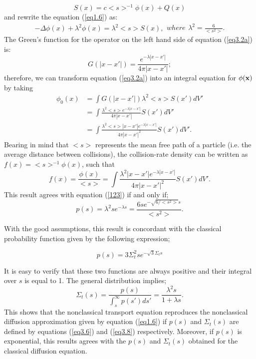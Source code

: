 \documentclass[a4paper, 12pt]{report}
\newcommand{\bl}{\big<}
\newcommand{\bg}{\big>}
\begin{document}
\begin{equation}
S(x) = c\bl s\bg^{-1}\phi(x)+Q(x)
\end{equation} 
and rewrite the equation (\ref{eq1.6}) as:
\begin{subequations}\label{eq3.2}
\begin{align}
-\Delta\phi(x) + \lambda^2 \phi(x) = \lambda^2 \bl s \bg S(x),\label{eq3.2a}
\end{align}
where
\begin{align}
\lambda^2=\frac{6}{\bl s^2 \bg}.
\end{align}
\end{subequations}
The Green's function for the operator on the left hand side of equation (\ref{eq3.2a}) is:
\begin{equation}
\label{eq3.3}
G(|x-x'|) = \frac{e^{-\lambda |x-x'|}}{4\pi |x-x'|};
\end{equation}
therefore, we can transform equation (\eqref{eq3.2a}) into an integral equation for $\phi(\bf x)$ by taking
\begin{align}\label{eq3.4}
\phi_0(x) &= \int G(|x-x'|) \lambda^2\bl s \bg S(x') dV' \\
&= \int \frac{\lambda^2\bl s \bg e^{-\lambda |x-x'|}}{4\pi  |x-x'|} S(x') dV'  \nonumber \\
&= \int \frac{\lambda^2 \bl s \bg |x-x'| e^{-\lambda |x-x'|}}{4\pi |x-x'|^2} S(x') dV'.\nonumber
\end{align}
Bearing in mind that $\bl s\bg$ represents the mean free path of a particle (i.e. the average distance between collisions), the collision-rate density can be written as $f(x)=\bl s\bg^{-1} \phi(x)$, such that
\begin{equation}
\label{eq3.5}
f(x)=\frac{\phi(x)}{\bl s \bg} = \int \frac{\lambda^2 |x-x'| e^{-\lambda |x-x'|}}{4\pi |x-x'|^2} S(x') dV'.
\end{equation}
This result agrees with equation (\ref{123}) if and only if;
\begin{equation}
\label{eq3.6}
p(s) = \lambda^2se^{-\lambda s}=\frac{6se^{-\sqrt{6/<s^2>}s}}{\bl s^2\bg}.
\end{equation}

With the good assumptions, this result is concordant with the classical probability function given by the following expression;

\begin{equation}
p(s) = 3\Sigma_t^2 se^{-\sqrt{3}\Sigma_t s}
\end{equation}

It is easy to verify that these two functions are always positive and their integral over $s$ is equal to 1.
The general distribution implies;
\begin{equation}
\label{eq3.8}
\Sigma_t(s) = \frac{p(s)}{\int_s^\infty p(s')ds'} = \frac{\lambda^2 s}{1+\lambda s}.
\end{equation}
This shows that the nonclassical transport equation reproduces the nonclassical diffusion approximation given by equation  (\ref{eq1.6}) if $p(s)$ and $\Sigma_t(s)$ are defined by equations (\ref{eq3.6}) and (\ref{eq3.8}) respectively. Moreover, if $p(s)$ is exponential, this results agrees with the $p(s)$ and $\Sigma_t(s)$ obtained for the classical diffusion equation.
\end{document}
